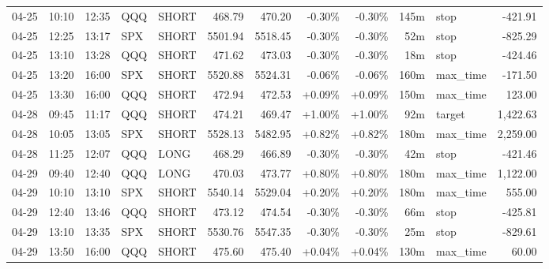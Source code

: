 \documentclass[11pt,a4paper,twoside]{article}
\begin{document}
\begin{center}
\begin{longtable}{>{\color{txtmain}}l l l l l r r r r r >{\color{txtmain}}l r}
04-25 & 10:10 & 12:35 & QQQ & SHORT & 468.79 & 470.20 & \textcolor{lossred}{-0.30\%} & \textcolor{lossred}{-0.30\%} & 145m & stop & \textcolor{lossred}{-421.91} \\
04-25 & 12:25 & 13:17 & SPX & SHORT & 5501.94 & 5518.45 & \textcolor{lossred}{-0.30\%} & \textcolor{lossred}{-0.30\%} & 52m & stop & \textcolor{lossred}{-825.29} \\
04-25 & 13:10 & 13:28 & QQQ & SHORT & 471.62 & 473.03 & \textcolor{lossred}{-0.30\%} & \textcolor{lossred}{-0.30\%} & 18m & stop & \textcolor{lossred}{-424.46} \\
04-25 & 13:20 & 16:00 & SPX & SHORT & 5520.88 & 5524.31 & \textcolor{lossred}{-0.06\%} & \textcolor{lossred}{-0.06\%} & 160m & max\_time & \textcolor{lossred}{-171.50} \\
04-25 & 13:30 & 16:00 & QQQ & SHORT & 472.94 & 472.53 & \textcolor{wingreen}{+0.09\%} & \textcolor{wingreen}{+0.09\%} & 150m & max\_time & \textcolor{wingreen}{123.00} \\
04-28 & 09:45 & 11:17 & QQQ & SHORT & 474.21 & 469.47 & \textcolor{wingreen}{+1.00\%} & \textcolor{wingreen}{+1.00\%} & 92m & target & \textcolor{wingreen}{1,422.63} \\
04-28 & 10:05 & 13:05 & SPX & SHORT & 5528.13 & 5482.95 & \textcolor{wingreen}{+0.82\%} & \textcolor{wingreen}{+0.82\%} & 180m & max\_time & \textcolor{wingreen}{2,259.00} \\
04-28 & 11:25 & 12:07 & QQQ & LONG & 468.29 & 466.89 & \textcolor{lossred}{-0.30\%} & \textcolor{lossred}{-0.30\%} & 42m & stop & \textcolor{lossred}{-421.46} \\
04-29 & 09:40 & 12:40 & QQQ & LONG & 470.03 & 473.77 & \textcolor{wingreen}{+0.80\%} & \textcolor{wingreen}{+0.80\%} & 180m & max\_time & \textcolor{wingreen}{1,122.00} \\
04-29 & 10:10 & 13:10 & SPX & SHORT & 5540.14 & 5529.04 & \textcolor{wingreen}{+0.20\%} & \textcolor{wingreen}{+0.20\%} & 180m & max\_time & \textcolor{wingreen}{555.00} \\
04-29 & 12:40 & 13:46 & QQQ & SHORT & 473.12 & 474.54 & \textcolor{lossred}{-0.30\%} & \textcolor{lossred}{-0.30\%} & 66m & stop & \textcolor{lossred}{-425.81} \\
04-29 & 13:10 & 13:35 & SPX & SHORT & 5530.76 & 5547.35 & \textcolor{lossred}{-0.30\%} & \textcolor{lossred}{-0.30\%} & 25m & stop & \textcolor{lossred}{-829.61} \\
04-29 & 13:50 & 16:00 & QQQ & SHORT & 475.60 & 475.40 & \textcolor{wingreen}{+0.04\%} & \textcolor{wingreen}{+0.04\%} & 130m & max\_time & \textcolor{wingreen}{60.00} \\

\end{longtable}
\end{center}
\end{document}
